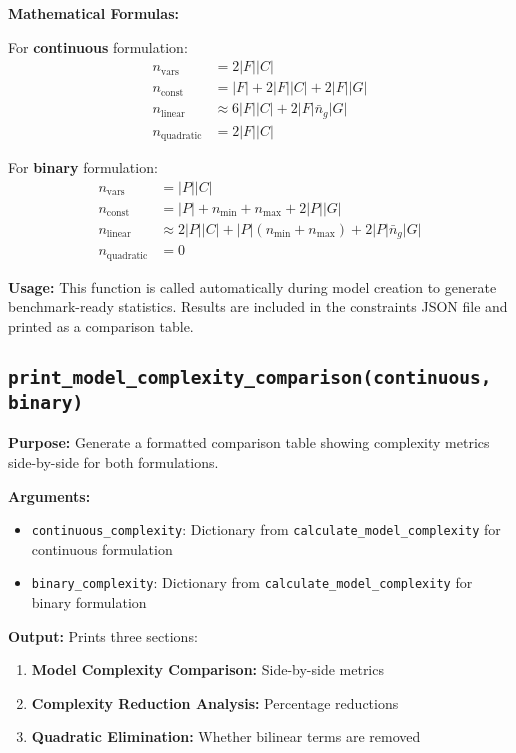 \documentclass{article}
\begin{document}
\textbf{Mathematical Formulas:}

For \textbf{continuous} formulation:
\begin{align*}
n_{\text{vars}} &= 2|F||C| \\
n_{\text{const}} &= |F| + 2|F||C| + 2|F||G| \\
n_{\text{linear}} &\approx 6|F||C| + 2|F|\bar{n}_g|G| \\
n_{\text{quadratic}} &= 2|F||C|
\end{align*}

For \textbf{binary} formulation:
\begin{align*}
n_{\text{vars}} &= |P||C| \\
n_{\text{const}} &= |P| + n_{\min} + n_{\max} + 2|P||G| \\
n_{\text{linear}} &\approx 2|P||C| + |P|(n_{\min} + n_{\max}) + 2|P|\bar{n}_g|G| \\
n_{\text{quadratic}} &= 0
\end{align*}

\textbf{Usage:} This function is called automatically during model creation to generate benchmark-ready statistics. Results are included in the constraints JSON file and printed as a comparison table.

\subsection{\texttt{print\_model\_complexity\_comparison(continuous, binary)}}

\textbf{Purpose:} Generate a formatted comparison table showing complexity metrics side-by-side for both formulations.

\textbf{Arguments:}
\begin{itemize}
    \item \texttt{continuous\_complexity}: Dictionary from \texttt{calculate\_model\_complexity} for continuous formulation
    \item \texttt{binary\_complexity}: Dictionary from \texttt{calculate\_model\_complexity} for binary formulation
\end{itemize}

\textbf{Output:} Prints three sections:
\begin{enumerate}
    \item \textbf{Model Complexity Comparison:} Side-by-side metrics
    \item \textbf{Complexity Reduction Analysis:} Percentage reductions
    \item \textbf{Quadratic Elimination:} Whether bilinear terms are removed
\end{enumerate}
\end{document}
